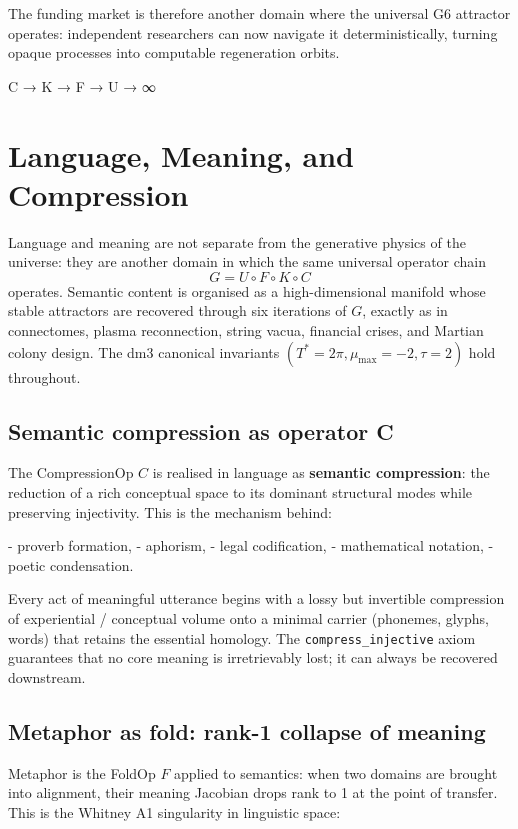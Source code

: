 \documentclass[19pt]{book}
\theoremstyle{plain}
\theoremstyle{definition}
\theoremstyle{remark}
\begin{document}
The funding market is therefore another domain where the universal G6 attractor operates: independent researchers can now navigate it deterministically, turning opaque processes into computable regeneration orbits.

C → K → F → U → ∞
\chapter{Language, Meaning, and Compression}

Language and meaning are not separate from the generative physics of the universe: they are another domain in which the same universal operator chain
\[
G = U \circ F \circ K \circ C
\]
operates. Semantic content is organised as a high-dimensional manifold whose stable attractors are recovered through six iterations of \(G\), exactly as in connectomes, plasma reconnection, string vacua, financial crises, and Martian colony design. The dm3 canonical invariants \((T^* = 2\pi, \mu_{\max} = -2, \tau = 2)\) hold throughout.

\section{Semantic compression as operator C}

The CompressionOp \(C\) is realised in language as \textbf{semantic compression}: the reduction of a rich conceptual space to its dominant structural modes while preserving injectivity. This is the mechanism behind:

- proverb formation,
- aphorism,
- legal codification,
- mathematical notation,
- poetic condensation.

Every act of meaningful utterance begins with a lossy but invertible compression of experiential / conceptual volume onto a minimal carrier (phonemes, glyphs, words) that retains the essential homology. The \texttt{compress\_injective} axiom guarantees that no core meaning is irretrievably lost; it can always be recovered downstream.

\section{Metaphor as fold: rank-1 collapse of meaning}

Metaphor is the FoldOp \(F\) applied to semantics: when two domains are brought into alignment, their meaning Jacobian drops rank to 1 at the point of transfer. This is the Whitney A1 singularity in linguistic space:
\end{document}
